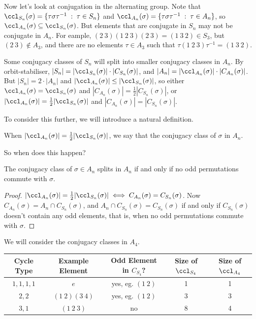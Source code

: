 Now let's look at conjugation in the alternating group. Note that $\ccl_{S_n}(\sigma) = \{\tau \sigma \tau^{-1} \; : \; \tau \in S_n\}$ and $\ccl_{A_n}(\sigma) = \{\tau \sigma \tau^{-1} \; : \; \tau \in A_n\}$, so $\ccl_{A_n}(\sigma) \subseteq \ccl_{S_n}(\sigma)$. But elements that are conjugate in $S_n$ may not be conjugate in $A_n$. For eample, $(2\ 3)(1\ 2\ 3)(2\ 3) = (1\ 3\ 2) \in S_3$, but $(2\ 3) \not\in A_3$, and there are no elements $\tau \in A_3$ such that $\tau (1\ 2\ 3)\tau^{-1} = (1\ 3\ 2)$. 

Some conjugacy classes of $S_n$ will split into smaller conjugacy classes in $A_n$. By orbit-stabiliser, $|S_n| = |\ccl_{S_n}(\sigma)| \cdot |C_{S_n}(\sigma)|$, and $|A_n| = |\ccl_{A_n}(\sigma)| \cdot |C_{A_n}(\sigma)|$. But $|S_n| = 2 \cdot |A_n|$ and $|\ccl_{A_n}(\sigma)| \leq |\ccl_{S_n}(\sigma)|$, so either $\ccl_{A_n}(\sigma) = \ccl_{S_n}(\sigma)$ and $|C_{A_n}(\sigma)| = \frac{1}{2}|C_{S_n}(\sigma)|$, or $|\ccl_{A_n}(\sigma)| = \frac{1}{2}|\ccl_{S_n}(\sigma)|$ and $|C_{A_n}(\sigma)| = |C_{S_n}(\sigma)|$.

To consider this further, we will introduce a natural definition.

\begin{definition}
When $|\ccl_{A_n}(\sigma)| = \frac{1}{2}|\ccl_{S_n}(\sigma)|$, we say that the conjugacy class of $\sigma$  in $A_n$.
\end{definition}

So when does this happen?

\begin{proposition}
	The conjugacy class of $\sigma \in A_n$ splits in $A_n$ if and only if no odd permutations commute with $\sigma$.
\end{proposition}
\begin{proof}
	$|\ccl_{A_n}(\sigma)| = \frac{1}{2}|\ccl_{S_n}(\sigma)| \iff C_{A_n}(\sigma) = C_{S_n}(\sigma)$. Now $C_{A_n}(\sigma) = A_n \cap C_{S_n}(\sigma)$, and $A_n \cap C_{S_n}(\sigma) = C_{S_n}(\sigma)$ if and only if $C_{S_n}(\sigma)$ doesn't contain any odd elements, that is, when no odd permutations commute with $\sigma$.
\end{proof}

\begin{example}
	We will consider the conjugacy classes in $A_4$. 
	\begin{center}
		\begin{tabular}{@{}ccccc@{}}
		\toprule
		Cycle Type & Example Element &Odd Element in $C_{S_4}$? & Size of $\ccl_{S_4}$ & Size of $\ccl_{A_4}$ \\ \midrule
		$1, 1, 1, 1$ & $e$ & yes, eg. $(1\ 2)$ & 1 & 1 \\
		$2, 2$ & $(1\ 2)(3\ 4)$ & yes, eg. $(1\ 2)$ & 3 & 3\\
		$3, 1$ & $(1\ 2\ 3)$ & no & 8 & 4\\
		\bottomrule
		\end{tabular}
	\end{center}
\end{example}

